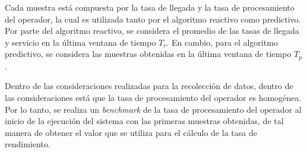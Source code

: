 \normalsize{Cada muestra est\'a compuesta por la tasa de llegada y la tasa de procesamiento del operador, la cual es utilizada tanto por el algoritmo reactivo como predictivo. Por parte del algoritmo reactivo, se considera el promedio de las tasas de llegada y servicio en la \'ultima ventana de tiempo $T_r$. En cambio, para el algoritmo predictivo, se considera las muestras obtenidas en la \'ultima ventana de tiempo $T_p$.

Dentro de las consideraciones realizadas para la recolecci\'on de datos, dentro de las consideraciones est\'a que la tasa de procesamiento del operador es homog\'enea. Por lo tanto, se realiza un \textit{benchmark} de la tasa de procesamiento del operador al inicio de la ejecuci\'on del sistema con las primeras muestras obtenidas, de tal manera de obtener el valor que se utiliza para el c\'alculo de la tasa de rendimiento.}




